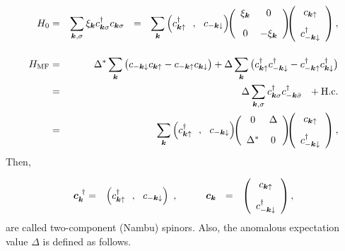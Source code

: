 \documentclass[uplatex,a4j,12pt,dvipdfmx]{jsarticle}
\begin{document}
\begin{eqnarray}
	H_{0}
	&=&
	\sum_{\bm{k},\sigma}
	\xi_{\bm{k}}
	c^{\dagger}_{\bm{k} \sigma}
	c_{\bm{k} \sigma}
	\ \ = \ \
	\sum_{\bm{k}}
	\left(
	c_{\bm{k} \uparrow}^{\dagger} \ \ , \ \
	c_{-\bm{k} \downarrow}
	\right)
	\!\!
	\left(
	\begin{array}{cc}
			\xi_{\bm{k}} & 0
			\\[3mm]
			0            & -\xi_{\bm{k}}
		\end{array}
	\right)
	\!\!\!
	\left(
	\begin{array}{c}
			c_{\bm{k} \uparrow} \\[3mm]
			c_{-\bm{k} \downarrow}^{\dagger}
		\end{array}
	\right)
	,
	\\[4mm]
	H_{\rm MF}
	&=&
	\Delta^{*}
	\sum_{\bm{k}}
	\big(
	c_{-\bm{k} \downarrow}
	c_{\bm{k} \uparrow}
	-
	c_{-\bm{k} \uparrow}
	c_{\bm{k} \downarrow}
	\big)
	+
	\Delta
	\sum_{\bm{k}}
	\big(
	c^{\dagger}_{\bm{k} \uparrow}
	c^{\dagger}_{-\bm{k} \downarrow}
	-
	c^{\dagger}_{-\bm{k} \uparrow}
	c^{\dagger}_{\bm{k} \downarrow}
	\big)
	\\ &=&
	\Delta
	\sum_{\bm{k}, \sigma}
	c^{\dagger}_{\bm{k} \sigma}
	c^{\dagger}_{-\bm{k} \bar{\sigma}}
	\ \ +
	{\rm H.c.}
	\\ &=&
	\sum_{\bm{k}}
	\left(
	c_{\bm{k} \uparrow}^{\dagger} \ \ , \ \
	c_{-\bm{k} \downarrow}
	\right)
	\!\!
	\left(
	\begin{array}{cc}
			0          & \Delta \\[3mm]
			\Delta^{*} & 0
		\end{array}
	\right)
	\!\!\!
	\left(
	\begin{array}{c}
			c_{\bm{k} \uparrow} \\[3mm]
			c_{-\bm{k} \downarrow}^{\dagger}
		\end{array}
	\right)
	,
\end{eqnarray}
%
Then,

\begin{eqnarray}
	\bm{c}^{\ \dagger}_{\bm{k}}
	&=&
	\left(
	c_{\bm{k} \uparrow}^{\dagger} \ \ , \ \
	c_{-\bm{k} \downarrow}
	\right)
	\ , \hspace{10mm}
	\bm{c}_{\bm{k}}
	\ \ = \ \
	\left(
	\begin{array}{c}
			c_{\bm{k} \uparrow} \\[3mm]
			c_{-\bm{k} \downarrow}^{\dagger}
		\end{array}
	\right)
	,
\end{eqnarray}
%
are called two-component (Nambu) spinors.
Also, the anomalous expectation value $\Delta$ is defined as follows.
\end{document}
